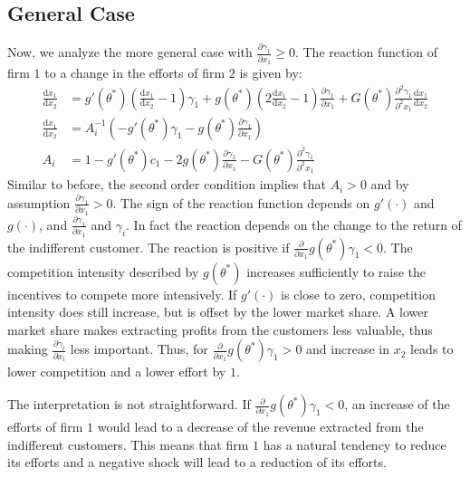 \documentclass[a4paper, 11pt]{article}
\renewcommand{\d}{\text{d}}
\begin{document}
\subsection{General Case}
Now, we analyze the more general case with $\frac{\partial \gamma_1}{\partial x_1}\geq 0$. The reaction function of firm $1$ to a change in the efforts of firm $2$ is given by:
\begin{align}
\frac{\d x_1}{\d x_2} &= g'(\theta^*)\left(\tfrac{\d x_1}{\d x_2}-1\right)\gamma_1 + g(\theta^*)\left(2\tfrac{\d x_1}{\d x_2}-1\right)\tfrac{\partial \gamma_1}{\partial x_1} + G(\theta^*)\tfrac{\partial^2 \gamma_1}{\partial^2 x_1}\tfrac{\d x_1}{\d x_2}\nonumber\\
\frac{\d x_1}{\d x_2} &= A_i^{-1} \left(-g'(\theta^*)\gamma_1- g(\theta^*)\frac{\partial \gamma_1}{\partial x_1}\right)\\
A_i &= 1 - g'(\theta^*)c_1-2g(\theta^*)\frac{\partial \gamma_1}{\partial x_1}-G(\theta^*)\frac{\partial^2 \gamma_1}{\partial^2 x_1}
\end{align} 
Similar to before, the second order condition implies that $A_i>0$ and by assumption $\frac{\partial \gamma_1}{\partial x_1}>0$. The sign of the reaction function depends on $g'(\cdot)$ and $g(\cdot)$, and $\frac{\partial \gamma_1}{\partial x_1}$ and $\gamma_i$. In fact the reaction depends on the change to the return of the indifferent customer. The reaction is positive if $\frac{\partial}{\partial x_1} g(\theta^*)\gamma_1<0$. The competition intensity described by $g(\theta^*)$ increases sufficiently to raise the incentives to compete more intensively. If $g'(\cdot)$ is close to zero, competition intensity does still increase, but is offset by the lower market share. A lower market share makes extracting profits from the customers less valuable, thus making $\frac{\partial \gamma_i}{\partial x_i}$ less important. Thus, for $\frac{\partial}{\partial x_1} g(\theta^*)\gamma_1>0$ and increase in $x_2$ leads to lower competition and a lower effort by $1$.

The interpretation is not straightforward. If $\frac{\partial}{\partial x_1} g(\theta^*)\gamma_1<0$, an increase of the efforts of firm $1$ would lead to a decrease of the revenue extracted from the indifferent customers. This means that firm $1$ has a natural tendency to reduce its efforts and a negative shock will lead to a reduction of its efforts. 

\end{document}
